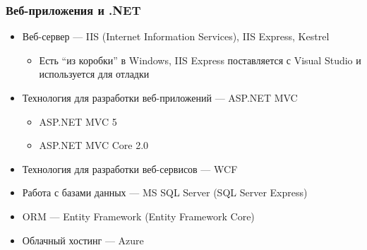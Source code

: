 \documentclass[xetex,mathserif,serif]{beamer}
\begin{document}
	\begin{frame}
		\frametitle{Веб-приложения и .NET}
		\begin{itemize}
			\item Веб-сервер --- IIS (Internet Information Services), IIS Express, Kestrel
			\begin{itemize}
				\item Есть ``из коробки'' в Windows, IIS Express поставляется с Visual Studio и используется для отладки
			\end{itemize}
			\item Технология для разработки веб-приложений --- ASP.NET MVC
			\begin{itemize}
				\item ASP.NET MVC 5
				\item ASP.NET MVC Core 2.0
			\end{itemize}
			\item Технология для разработки веб-сервисов --- WCF
			\item Работа с базами данных --- MS SQL Server (SQL Server Express)
			\item ORM --- Entity Framework (Entity Framework Core)
			\item Облачный хостинг --- Azure
		\end{itemize}
	\end{frame}
\end{document}
